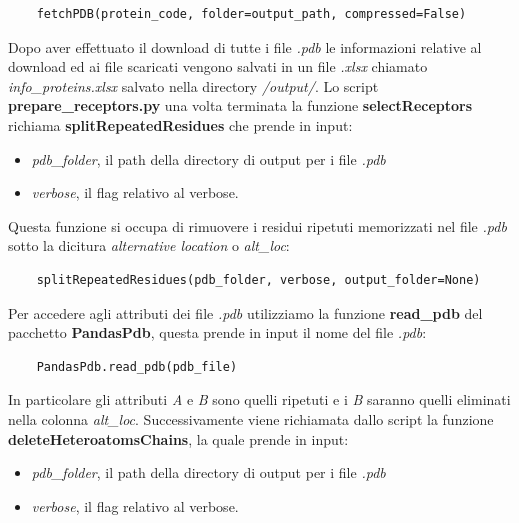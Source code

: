 \begin{verbatim}
    fetchPDB(protein_code, folder=output_path, compressed=False)
\end{verbatim}

Dopo aver effettuato il download di tutte i file \textit{.pdb} le informazioni relative al download ed ai file scaricati vengono salvati in un file \textit{.xlsx} chiamato \textit{info\_proteins.xlsx} salvato nella directory \textit{/output/}.\newline
Lo script \textbf{prepare\_receptors.py} una volta terminata la funzione \textbf{selectReceptors} richiama \textbf{splitRepeatedResidues} che prende in input:

\begin{itemize}
    \item \textit{pdb\_folder}, il path della directory di output per i file \textit{.pdb}
    \item \textit{verbose}, il flag relativo al verbose.
\end{itemize}

Questa funzione si occupa di rimuovere i residui ripetuti memorizzati nel file \textit{.pdb} sotto la dicitura \textit{alternative location} o \textit{alt\_loc}:

\begin{verbatim}
    splitRepeatedResidues(pdb_folder, verbose, output_folder=None)    
\end{verbatim}

Per accedere agli attributi dei file \textit{.pdb} utilizziamo la funzione \textbf{read\_pdb} del pacchetto \textbf{PandasPdb}, questa prende in input il nome del file \textit{.pdb}:

\begin{verbatim}
    PandasPdb.read_pdb(pdb_file)
\end{verbatim}

In particolare gli attributi \textit{A} e \textit{B} sono quelli ripetuti e i \textit{B} saranno quelli eliminati nella colonna \textit{alt\_loc}.\newline
Successivamente viene richiamata dallo script la funzione \textbf{deleteHeteroatomsChains}, la quale prende in input:

\begin{itemize}
    \item \textit{pdb\_folder}, il path della directory di output per i file \textit{.pdb}
    \item \textit{verbose}, il flag relativo al verbose.
\end{itemize}

